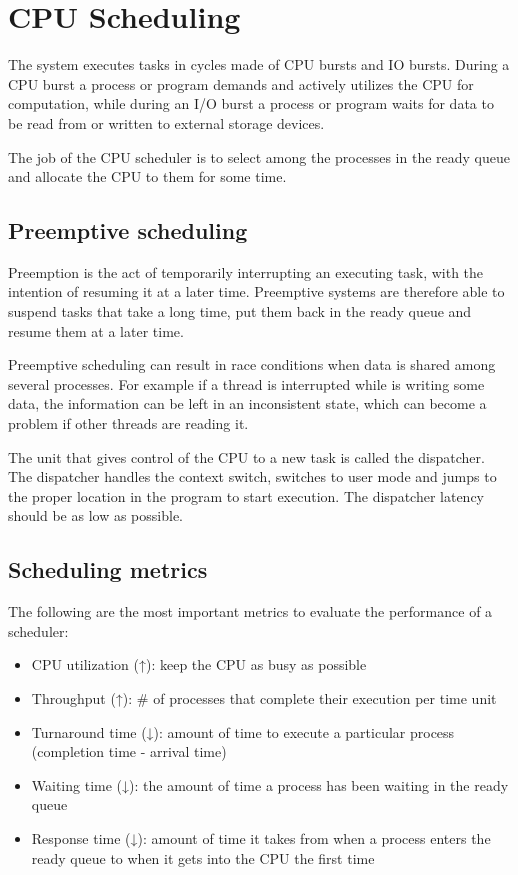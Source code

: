 \chapter{CPU Scheduling}

The system executes tasks in cycles made of CPU bursts and IO bursts. During a CPU burst a process or program demands and actively utilizes the CPU for computation, while during an I/O burst a process or program waits for data to be read from or written to external storage devices.


The job of the CPU scheduler is to select among the processes in the ready queue and allocate the CPU to them for some time.

\section{Preemptive scheduling}
Preemption is the act of temporarily interrupting an executing task, with the intention of resuming it at a later time. Preemptive systems are therefore able to suspend tasks that take a long time, put them back in the ready queue and resume them at a later time. 

Preemptive scheduling can result in race conditions when data is shared among several processes. For example if a thread is interrupted while is writing some data, the information can be left in an inconsistent state, which can become a problem if other threads are reading it.

The unit that gives control of the CPU to a new task is called the dispatcher. The dispatcher handles the context switch, switches to user mode and jumps to the proper location in the program to start execution. The dispatcher latency should be as low as possible.

\section{Scheduling metrics}
The following are the most important metrics to evaluate the performance of a scheduler:
\begin{itemize}
    \item CPU utilization (↑): keep the CPU as busy as possible
    \item Throughput (↑): \# of processes that complete their execution per time unit
    \item Turnaround time (↓): amount of time to execute a particular process (completion time - arrival time)
    \item Waiting time (↓): the amount of time a process has been waiting in the ready queue
    \item Response time (↓): amount of time it takes from when a process enters the ready queue to when it gets into the CPU the first time
\end{itemize}

